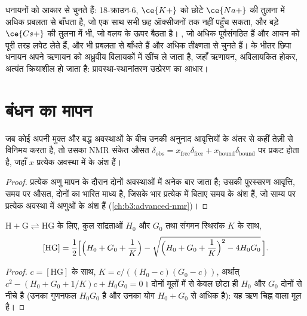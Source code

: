  धनायनों को आकार से चुनते हैं: 18-क्राउन-6, $\ce{K+}$ को
छोटे $\ce{Na+}$ की तुलना में अधिक प्रबलता से बाँधता है, जो एक साथ सभी छह ऑक्सीजनों तक नहीं पहुँच सकता, और बड़े $\ce{Cs+}$ की तुलना में भी, जो
वलय के ऊपर बैठता है। , जो अधिक पूर्वसंगठित हैं और आयन को
पूरी तरह लपेट लेते हैं, और भी प्रबलता से बाँधते हैं और अधिक तीक्ष्णता से चुनते हैं।  के भीतर छिपा
धनायन अपने ऋणायन को अध्रुवीय विलायकों में खींच ले जाता है, जहाँ ऋणायन,
अविलायकित होकर, अत्यंत क्रियाशील हो जाता है: प्रावस्था-स्थानांतरण उत्प्रेरण का आधार।

\section{बंधन का मापन}

\begin{proposition}[तीव्र विनिमय]\label{prop:b3:supramolecular:fast-exchange}
जब कोई  अपनी मुक्त और बद्ध अवस्थाओं के बीच उनकी अनुनाद आवृत्तियों के
अंतर से कहीं तेज़ी से विनिमय करता है, तो उसका NMR संकेत औसत
$\delta_{\mathrm{obs}} = x_{\mathrm{free}}\delta_{\mathrm{free}} + x_{\mathrm{bound}}\delta_{\mathrm{bound}}$ पर प्रकट होता है, जहाँ $x$ प्रत्येक अवस्था में  के अंश हैं।
\end{proposition}

\begin{proof}
प्रत्येक  अणु मापन के दौरान दोनों अवस्थाओं में अनेक बार जाता है; उसकी
पुरस्सरण आवृत्ति, समय पर औसत, दोनों का भारित माध्य है, जिसके
भार प्रत्येक में बिताए समय के अंश हैं, जो साम्य पर प्रत्येक अवस्था में
अणुओं के अंश हैं (\cref{ch:b3:advanced-nmr})।
\end{proof}

\begin{theorem}[यथार्थ 1:1 समतापी]\label{thm:b3:supramolecular:isotherm}
$\mathrm{H + G \rightleftharpoons HG}$ के लिए, कुल सांद्रताओं $H_0$ और $G_0$ तथा संगमन स्थिरांक $K$ के साथ,
\[
  [\mathrm{HG}] = \frac{1}{2}\Bigl[\Bigl(H_0 + G_0 + \frac1K\Bigr) - \sqrt{\Bigl(H_0 + G_0 + \frac1K\Bigr)^2 - 4H_0G_0}\,\Bigr].
\]
\end{theorem}

\begin{proof}
$c = [\mathrm{HG}]$ के साथ, $K = c/((H_0 - c)(G_0 - c))$, अर्थात् $c^2 - (H_0 + G_0 + 1/K)c + H_0G_0 = 0$। दोनों मूलों में से
केवल छोटा ही $H_0$ और $G_0$ दोनों से नीचे है (उनका गुणनफल $H_0G_0$ है और उनका योग
$H_0 + G_0$ से अधिक है): यह ऋण चिह्न वाला मूल है।
\end{proof}

